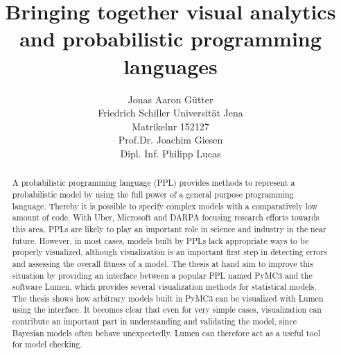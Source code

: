 \documentclass{article}
\title{Bringing together visual analytics and probabilistic programming languages}
\author{Jonas Aaron Gütter  \\
	Friedrich Schiller Universität Jena  \\
    Matrikelnr 152127 \\
    Prof.Dr. Joachim Giesen \\
    Dipl. Inf. Philipp Lucas
	}
\begin{document}
\maketitle

\begin{abstract}
A probabilistic programming language (PPL) provides methods to represent a probabilistic model by using the full power of a general purpose programming language. Thereby it is possible to specify complex models with a comparatively low amount of code. With Uber, Microsoft and DARPA focusing research efforts towards this area, PPLs are likely to play an important role in science and industry in the near future. However, in most cases, models built by PPLs lack appropriate ways to be properly visualized, although visualization is an important first step in detecting errors and assessing the overall fitness of a model. The thesis at hand aim to improve this situation by providing an interface between a popular PPL named PyMC3 and the software Lumen, which provides several visualization methods for statistical models. The thesis shows how arbitrary models built in PyMC3 can be visualized with Lumen using the interface. It becomes clear that even for very simple cases, visualization can contribute an important part in understanding and validating the model, since Bayesian models often behave unexpectedly. Lumen can therefore act as a useful tool for model checking.
\end{abstract}

\pagebreak
\tableofcontents


\printglossaries
\end{document}
